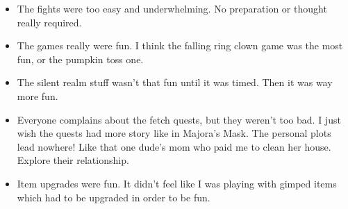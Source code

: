 \begin{itemize}
	\item{The fights were too easy and underwhelming. No preparation or thought really required.}
 \item{The games really were fun. I think the falling ring clown game was the most fun,
	or the pumpkin toss one.}
 \item{The silent realm stuff wasn't that fun until it was timed. Then it was way more fun.}
 \item{Everyone complains about the fetch quests, but they weren't too bad. I just wish the 
	quests had more story like in Majora's Mask. The personal plots lead nowhere! Like
	that one dude's mom who paid me to clean her house. Explore their relationship.}
 \item{Item upgrades were fun. It didn't feel like I was playing with gimped items which
	had to be upgraded in order to be fun.}
\end{itemize}


\newpage
{}

